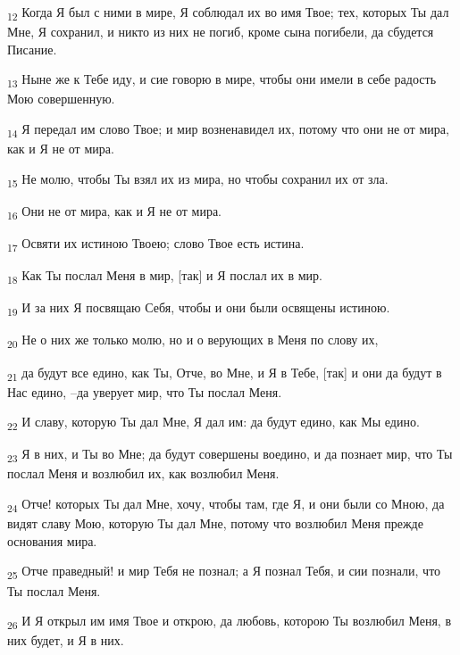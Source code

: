 \begin{tcolorbox}
\textsubscript{12} Когда Я был с ними в мире, Я соблюдал их во имя Твое; тех, которых Ты дал Мне, Я сохранил, и никто из них не погиб, кроме сына погибели, да сбудется Писание.
\end{tcolorbox}
\begin{tcolorbox}
\textsubscript{13} Ныне же к Тебе иду, и сие говорю в мире, чтобы они имели в себе радость Мою совершенную.
\end{tcolorbox}
\begin{tcolorbox}
\textsubscript{14} Я передал им слово Твое; и мир возненавидел их, потому что они не от мира, как и Я не от мира.
\end{tcolorbox}
\begin{tcolorbox}
\textsubscript{15} Не молю, чтобы Ты взял их из мира, но чтобы сохранил их от зла.
\end{tcolorbox}
\begin{tcolorbox}
\textsubscript{16} Они не от мира, как и Я не от мира.
\end{tcolorbox}
\begin{tcolorbox}
\textsubscript{17} Освяти их истиною Твоею; слово Твое есть истина.
\end{tcolorbox}
\begin{tcolorbox}
\textsubscript{18} Как Ты послал Меня в мир, [так] и Я послал их в мир.
\end{tcolorbox}
\begin{tcolorbox}
\textsubscript{19} И за них Я посвящаю Себя, чтобы и они были освящены истиною.
\end{tcolorbox}
\begin{tcolorbox}
\textsubscript{20} Не о них же только молю, но и о верующих в Меня по слову их,
\end{tcolorbox}
\begin{tcolorbox}
\textsubscript{21} да будут все едино, как Ты, Отче, во Мне, и Я в Тебе, [так] и они да будут в Нас едино, --да уверует мир, что Ты послал Меня.
\end{tcolorbox}
\begin{tcolorbox}
\textsubscript{22} И славу, которую Ты дал Мне, Я дал им: да будут едино, как Мы едино.
\end{tcolorbox}
\begin{tcolorbox}
\textsubscript{23} Я в них, и Ты во Мне; да будут совершены воедино, и да познает мир, что Ты послал Меня и возлюбил их, как возлюбил Меня.
\end{tcolorbox}
\begin{tcolorbox}
\textsubscript{24} Отче! которых Ты дал Мне, хочу, чтобы там, где Я, и они были со Мною, да видят славу Мою, которую Ты дал Мне, потому что возлюбил Меня прежде основания мира.
\end{tcolorbox}
\begin{tcolorbox}
\textsubscript{25} Отче праведный! и мир Тебя не познал; а Я познал Тебя, и сии познали, что Ты послал Меня.
\end{tcolorbox}
\begin{tcolorbox}
\textsubscript{26} И Я открыл им имя Твое и открою, да любовь, которою Ты возлюбил Меня, в них будет, и Я в них.
\end{tcolorbox}
